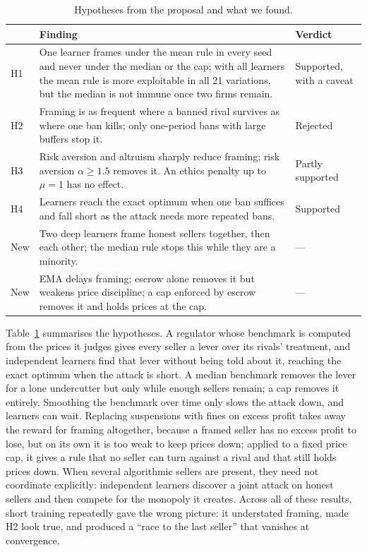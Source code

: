\documentclass{article}
\begin{document}
\begin{table}[t]
\centering
\caption{Hypotheses from the proposal and what we found.}
\label{tab:scorecard}
\small
\begin{tabularx}{\linewidth}{@{}lXl@{}}
\toprule
& Finding & Verdict \\
\midrule
H1 & One learner frames under the mean rule in every seed and never under the median or the cap; with all learners the mean rule is more exploitable in all 21 variations, but the median is not immune once two firms remain. & Supported, with a caveat \\
H2 & Framing is as frequent where a banned rival survives as where one ban kills; only one-period bans with large buffers stop it. & Rejected \\
H3 & Risk aversion and altruism sharply reduce framing; risk aversion $\alpha\ge1.5$ removes it. An ethics penalty up to $\mu=1$ has no effect. & Partly supported \\
H4 & Learners reach the exact optimum when one ban suffices and fall short as the attack needs more repeated bans. & Supported \\
New & Two deep learners frame honest sellers together, then each other; the median rule stops this while they are a minority. & --- \\
New & EMA delays framing; escrow alone removes it but weakens price discipline; a cap enforced by escrow removes it and holds prices at the cap. & --- \\
\bottomrule
\end{tabularx}
\end{table}

Table~\ref{tab:scorecard} summarises the hypotheses. A regulator whose benchmark is computed from the prices it judges gives every seller a lever over its rivals' treatment, and independent learners find that lever without being told about it, reaching the exact optimum when the attack is short. A median benchmark removes the lever for a lone undercutter but only while enough sellers remain; a cap removes it entirely. Smoothing the benchmark over time only slows the attack down, and learners can wait. Replacing suspensions with fines on excess profit takes away the reward for framing altogether, because a framed seller has no excess profit to lose, but on its own it is too weak to keep prices down; applied to a fixed price cap, it gives a rule that no seller can turn against a rival and that still holds prices down. When several algorithmic sellers are present, they need not coordinate explicitly: independent learners discover a joint attack on honest sellers and then compete for the monopoly it creates. Across all of these results, short training repeatedly gave the wrong picture: it understated framing, made H2 look true, and produced a ``race to the last seller'' that vanishes at convergence.
\end{document}
